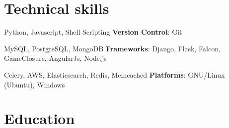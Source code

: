 \documentclass[11pt,a4paper]{moderncv}
\begin{document}
\maketitle

\section{Technical skills}
           {Python, Javascript, Shell Scripting}
           {\textbf{Version Control}: }
           {Git}

           {MySQL, PostgreSQL, MongoDB}
           {\textbf{Frameworks}: }
           {Django, Flask, Falcon, GameClosure, AngularJs, Node.js}

           {Celery, AWS, Elasticsearch, Redis, Memcached}
           {\textbf{Platforms}: }
           {GNU/Linux (Ubuntu), Windows}

\section{Education}
\end{document}
